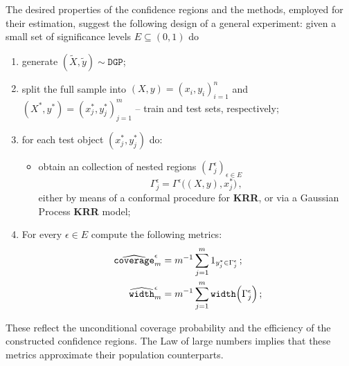 \documentclass[a4paper,14pt]{article}
\begin{document}
The desired properties of the confidence regions and the methods, employed for their
estimation, suggest the following design of a general experiment:
given a small set of significance levels $E\subseteq (0,1)$ do
\begin{enumerate}
    \item generate $(\tilde{X}, \tilde{y}) \sim \mathtt{DGP}$;
    \item split the full sample into $(X, y) = (x_i, y_i)_{i=1}^n$ and
    $(X^*, y^*) = (x^*_j, y^*_j)_{j=1}^m$ -- train and test sets, respectively;
    \item for each test object $(x^*_j, y^*_j)$ do:\begin{itemize}
      \item obtain an collection of nested regions $(\Gamma^\epsilon_j)_{\epsilon\in E}$
      $$ \Gamma^\epsilon_j
        = \Gamma^\epsilon\bigl((X, y), x^*_j\bigr) \,, $$
      either by means of a conformal procedure for \textbf{KRR}, or via a Gaussian
      Process \textbf{KRR} model;
    \end{itemize}
    \item For every $\epsilon \in E$ compute the following metrics:
    \begin{align*}
        \widehat{\mathtt{coverage}}^\epsilon_m &= m^{-1} \sum_{j=1}^m 1_{y^*_j \in \Gamma^\epsilon_j} \,; \\
        \widehat{\mathtt{width}}^\epsilon_m &= m^{-1} \sum_{j=1}^m \mathtt{width}\Bigl(\Gamma^\epsilon_j\Bigr) \,; \\
    \end{align*}
\end{enumerate}
These reflect the unconditional coverage probability and the efficiency of the constructed
confidence regions. The Law of large numbers implies that these metrics approximate their
population counterparts.



\end{document}
